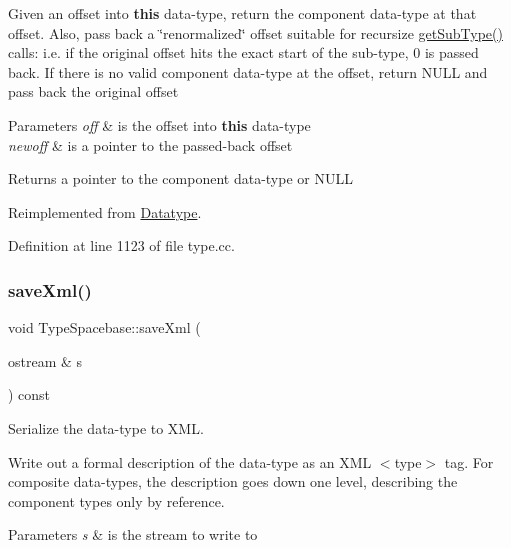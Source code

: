 Given an offset into {\bfseries{this}} data-\/type, return the component data-\/type at that offset. Also, pass back a \char`\"{}renormalized\char`\"{} offset suitable for recursize \mbox{\hyperlink{class_type_spacebase_a0dc2b2f9eadee2b8c79e2403a9c908fe}{get\+Sub\+Type()}} calls\+: i.\+e. if the original offset hits the exact start of the sub-\/type, 0 is passed back. If there is no valid component data-\/type at the offset, return N\+U\+LL and pass back the original offset 
\begin{DoxyParams}{Parameters}
{\em off} & is the offset into {\bfseries{this}} data-\/type \\
\hline
{\em newoff} & is a pointer to the passed-\/back offset \\
\hline
\end{DoxyParams}
\begin{DoxyReturn}{Returns}
a pointer to the component data-\/type or N\+U\+LL 
\end{DoxyReturn}


Reimplemented from \mbox{\hyperlink{class_datatype_ac310ccfdc47d145f10699fa1e14e73b4}{Datatype}}.



Definition at line 1123 of file type.\+cc.

\mbox{\label{class_type_spacebase_a6540d83aa3ef2daf7bddeba9a0552c8f}} 
\subsubsection{\texorpdfstring{saveXml()}{saveXml()}}
{\footnotesize\ttfamily void Type\+Spacebase\+::save\+Xml (\begin{DoxyParamCaption}\item[{ostream \&}]{s }\end{DoxyParamCaption}) const\hspace{0.3cm}{\ttfamily [virtual]}}



Serialize the data-\/type to X\+ML. 

Write out a formal description of the data-\/type as an X\+ML $<$type$>$ tag. For composite data-\/types, the description goes down one level, describing the component types only by reference. 
\begin{DoxyParams}{Parameters}
{\em s} & is the stream to write to \\
\hline
\end{DoxyParams}


